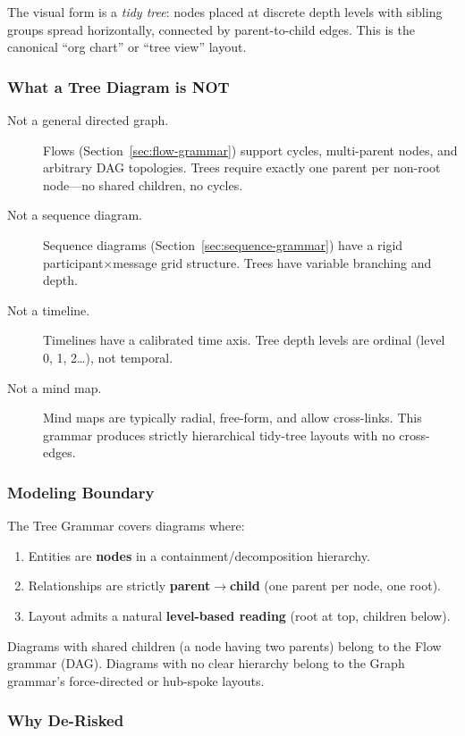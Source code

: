 The visual form is a \emph{tidy tree}: nodes placed at discrete depth levels with sibling groups spread horizontally, connected by parent-to-child edges. This is the canonical ``org chart'' or ``tree view'' layout.

\subsubsection{What a Tree Diagram is NOT}

\begin{description}
  \item[Not a general directed graph.] Flows (Section~\ref{sec:flow-grammar}) support cycles, multi-parent nodes, and arbitrary DAG topologies. Trees require exactly one parent per non-root node---no shared children, no cycles.
  \item[Not a sequence diagram.] Sequence diagrams (Section~\ref{sec:sequence-grammar}) have a rigid participant$\times$message grid structure. Trees have variable branching and depth.
  \item[Not a timeline.] Timelines have a calibrated time axis. Tree depth levels are ordinal (level 0, 1, 2\ldots), not temporal.
  \item[Not a mind map.] Mind maps are typically radial, free-form, and allow cross-links. This grammar produces strictly hierarchical tidy-tree layouts with no cross-edges.
\end{description}

\subsubsection{Modeling Boundary}

The Tree Grammar covers diagrams where:
\begin{enumerate}
  \item Entities are \textbf{nodes} in a containment/decomposition hierarchy.
  \item Relationships are strictly \textbf{parent$\rightarrow$child} (one parent per node, one root).
  \item Layout admits a natural \textbf{level-based reading} (root at top, children below).
\end{enumerate}

Diagrams with shared children (a node having two parents) belong to the Flow grammar (DAG). Diagrams with no clear hierarchy belong to the Graph grammar's force-directed or hub-spoke layouts.

\subsubsection{Why De-Risked}

